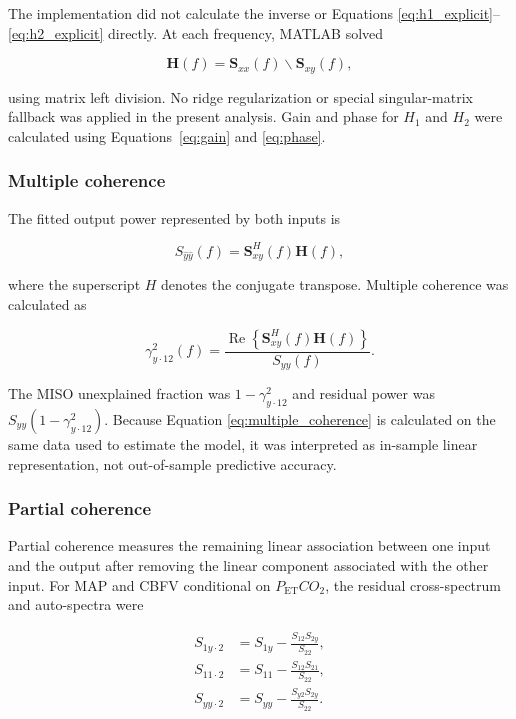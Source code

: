 \documentclass[12pt]{article}
\newcommand{\PETCOtwo}{P_{\mathrm{ET}}CO_2}
\newcommand{\Real}{\operatorname{Re}}
\begin{document}
The implementation did not calculate the inverse or Equations
\ref{eq:h1_explicit}--\ref{eq:h2_explicit} directly. At each frequency, MATLAB
solved

\begin{equation}
    \mathbf{H}(f)=\mathbf{S}_{xx}(f)\backslash\mathbf{S}_{xy}(f),
    \label{eq:miso_solve}
\end{equation}

using matrix left division. No ridge regularization or special singular-matrix
fallback was applied in the present analysis. Gain and phase for $H_1$ and
$H_2$ were calculated using Equations~\ref{eq:gain} and \ref{eq:phase}.

\subsubsection{Multiple coherence}

The fitted output power represented by both inputs is

\begin{equation}
    S_{\widehat{y}\widehat{y}}(f)
    =\mathbf{S}_{xy}^{H}(f)\mathbf{H}(f),
\end{equation}

where the superscript $H$ denotes the conjugate transpose. Multiple coherence
was calculated as

\begin{equation}
    \gamma^2_{y\cdot 12}(f)=
    \frac{\Real\left\{\mathbf{S}_{xy}^{H}(f)
    \mathbf{H}(f)\right\}}{S_{yy}(f)}.
    \label{eq:multiple_coherence}
\end{equation}

The MISO unexplained fraction was $1-\gamma^2_{y\cdot 12}$ and residual power
was $S_{yy}(1-\gamma^2_{y\cdot 12})$. Because Equation
\ref{eq:multiple_coherence} is calculated on the same data used to estimate
the model, it was interpreted as in-sample linear representation, not
out-of-sample predictive accuracy.

\subsubsection{Partial coherence}

Partial coherence measures the remaining linear association between one input
and the output after removing the linear component associated with the other
input. For MAP and CBFV conditional on $\PETCOtwo$, the residual cross-spectrum
and auto-spectra were

\begin{align}
    S_{1y\cdot2}
    &=S_{1y}-\frac{S_{12}S_{2y}}{S_{22}},\\
    S_{11\cdot2}
    &=S_{11}-\frac{S_{12}S_{21}}{S_{22}},\\
    S_{yy\cdot2}
    &=S_{yy}-\frac{S_{y2}S_{2y}}{S_{22}}.
\end{align}
\end{document}
